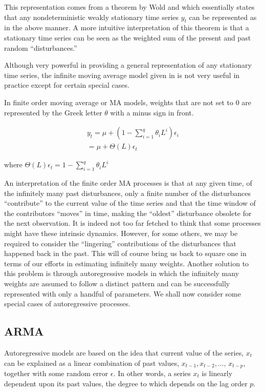 \documentclass[
  11pt,
]{article}
\begin{document}
This representation comes from a theorem by Wold and which essentially
states that any nondeterministic weakly stationary time series \(y_{t}\)
can be represented as in the above manner. A more intuitive
interpretation of this theorem is that a stationary time series can be
seen as the weighted sum of the present and past random
``disturbances.''

Although very powerful in providing a general representation of any
stationary time series, the infinite moving average model given in is
not very useful in practice except for certain special cases.

In finite order moving average or MA models, weights that are not set to
0 are represented by the Greek letter \(\theta\) with a minus sign in
front.

\begin{gather*}
y_{t} = \mu + \left(1 - \sum\limits_{i=1}^{q}\theta_{i}L^{i} \right)\epsilon_{i}\\[8pt]
= \mu + \Theta(L)\epsilon_{t}
\end{gather*}

where
\(\Theta(L)\epsilon_{t} = 1 - \sum\limits_{i=1}^{q}\theta_{i}L^{i}\)

An interpretation of the finite order MA processes is that at any given
time, of the infinitely many past disturbances, only a finite number of
the disturbances ``contribute'' to the current value of the time series
and that the time window of the contributors ``moves'' in time, making
the ``oldest'' disturbance obsolete for the next observation. It is
indeed not too far fetched to think that some processes might have these
intrinsic dynamics. However, for some others, we may be required to
consider the ``lingering'' contributions of the disturbances that
happened back in the past. This will of course bring us back to square
one in terms of our efforts in estimating infinitely many weights.
Another solution to this problem is through autoregressive models in
which the infinitely many weights are assumed to follow a distinct
pattern and can be successfully represented with only a handful of
parameters. We shall now consider some special cases of autoregressive
processes.

\hypertarget{arma}{%
\subsection{ARMA}\label{arma}}

Autoregressive models are based on the idea that current value of the
series, \(x_{t}\) can be explained as a linear combination of past
values, \(x_{t-1}, x_{t-2}, \ldots, \, x_{t-p}\), together with some
random error \(\epsilon\). In other words, a series \(x_{t}\) is
linearly dependent upon its past values, the degree to which depends on
the lag order \(p\).
\end{document}
